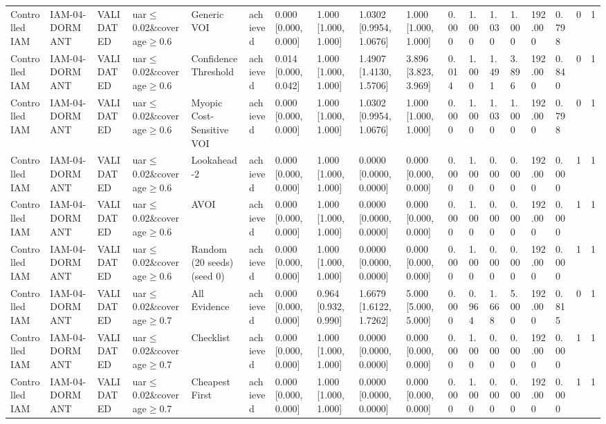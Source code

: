 \begin{table}[!ht]
{\begin{tabular}{llllllllllllllllll}
Controlled IAM & IAM-04-DORMANT & VALIDATED & uar$\le$0.02\&coverage$\ge$0.6 & Generic VOI & achieved & 0.000 [0.000, 0.000] & 1.000 [1.000, 1.000] & 1.0302 [0.9954, 1.0676] & 1.000 [1.000, 1.000] & 0.000 & 1.000 & 1.030 & 1.000 & 192.000 & 0.798 & 0 & 1 \\
Controlled IAM & IAM-04-DORMANT & VALIDATED & uar$\le$0.02\&coverage$\ge$0.6 & Confidence Threshold & achieved & 0.014 [0.000, 0.042] & 1.000 [1.000, 1.000] & 1.4907 [1.4130, 1.5706] & 3.896 [3.823, 3.969] & 0.014 & 1.000 & 1.491 & 3.896 & 192.000 & 0.840 & 0 & 1 \\
Controlled IAM & IAM-04-DORMANT & VALIDATED & uar$\le$0.02\&coverage$\ge$0.6 & Myopic Cost-Sensitive VOI & achieved & 0.000 [0.000, 0.000] & 1.000 [1.000, 1.000] & 1.0302 [0.9954, 1.0676] & 1.000 [1.000, 1.000] & 0.000 & 1.000 & 1.030 & 1.000 & 192.000 & 0.798 & 0 & 1 \\
Controlled IAM & IAM-04-DORMANT & VALIDATED & uar$\le$0.02\&coverage$\ge$0.6 & Lookahead-2 & achieved & 0.000 [0.000, 0.000] & 1.000 [1.000, 1.000] & 0.0000 [0.0000, 0.0000] & 0.000 [0.000, 0.000] & 0.000 & 1.000 & 0.000 & 0.000 & 192.000 & 0.000 & 1 & 1 \\
Controlled IAM & IAM-04-DORMANT & VALIDATED & uar$\le$0.02\&coverage$\ge$0.6 & AVOI & achieved & 0.000 [0.000, 0.000] & 1.000 [1.000, 1.000] & 0.0000 [0.0000, 0.0000] & 0.000 [0.000, 0.000] & 0.000 & 1.000 & 0.000 & 0.000 & 192.000 & 0.000 & 1 & 1 \\
Controlled IAM & IAM-04-DORMANT & VALIDATED & uar$\le$0.02\&coverage$\ge$0.6 & Random (20 seeds) (seed 0) & achieved & 0.000 [0.000, 0.000] & 1.000 [1.000, 1.000] & 0.0000 [0.0000, 0.0000] & 0.000 [0.000, 0.000] & 0.000 & 1.000 & 0.000 & 0.000 & 192.000 & 0.000 & 1 & 1 \\
Controlled IAM & IAM-04-DORMANT & VALIDATED & uar$\le$0.02\&coverage$\ge$0.7 & All Evidence & achieved & 0.000 [0.000, 0.000] & 0.964 [0.932, 0.990] & 1.6679 [1.6122, 1.7262] & 5.000 [5.000, 5.000] & 0.000 & 0.964 & 1.668 & 5.000 & 192.000 & 0.815 & 0 & 1 \\
Controlled IAM & IAM-04-DORMANT & VALIDATED & uar$\le$0.02\&coverage$\ge$0.7 & Checklist & achieved & 0.000 [0.000, 0.000] & 1.000 [1.000, 1.000] & 0.0000 [0.0000, 0.0000] & 0.000 [0.000, 0.000] & 0.000 & 1.000 & 0.000 & 0.000 & 192.000 & 0.000 & 1 & 1 \\
Controlled IAM & IAM-04-DORMANT & VALIDATED & uar$\le$0.02\&coverage$\ge$0.7 & Cheapest First & achieved & 0.000 [0.000, 0.000] & 1.000 [1.000, 1.000] & 0.0000 [0.0000, 0.0000] & 0.000 [0.000, 0.000] & 0.000 & 1.000 & 0.000 & 0.000 & 192.000 & 0.000 & 1 & 1 \\

\end{tabular}}
\end{table}

